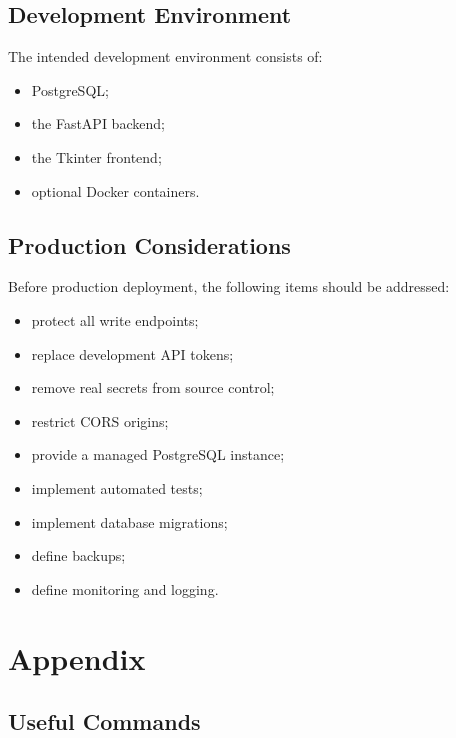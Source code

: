 \documentclass[12pt,a4paper]{article}
\begin{document}
\subsection{Development Environment}

The intended development environment consists of:

\begin{itemize}
    \item PostgreSQL;
    \item the FastAPI backend;
    \item the Tkinter frontend;
    \item optional Docker containers.
\end{itemize}

\subsection{Production Considerations}

Before production deployment, the following items should be addressed:

\begin{itemize}
    \item protect all write endpoints;
    \item replace development API tokens;
    \item remove real secrets from source control;
    \item restrict CORS origins;
    \item provide a managed PostgreSQL instance;
    \item implement automated tests;
    \item implement database migrations;
    \item define backups;
    \item define monitoring and logging.
\end{itemize}


\section{Appendix}

\subsection{Useful Commands}
\end{document}
